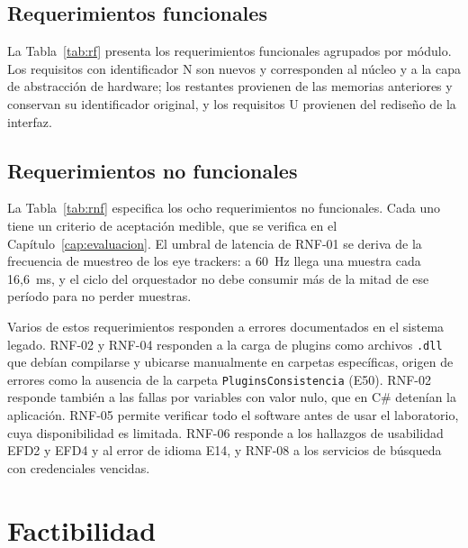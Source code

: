 \subsection{Requerimientos funcionales}

La Tabla~\ref{tab:rf} presenta los requerimientos funcionales agrupados por módulo. Los requisitos con identificador N son nuevos y corresponden al núcleo y a la capa de abstracción de hardware; los restantes provienen de las memorias anteriores y conservan su identificador original, y los requisitos U provienen del rediseño de la interfaz.

{\small}
\vspace{-1em}

\subsection{Requerimientos no funcionales}

La Tabla~\ref{tab:rnf} especifica los ocho requerimientos no funcionales. Cada uno tiene un criterio de aceptación medible, que se verifica en el Capítulo~\ref{cap:evaluacion}. El umbral de latencia de RNF-01 se deriva de la frecuencia de muestreo de los eye trackers: a 60~Hz llega una muestra cada 16,6~ms, y el ciclo del orquestador no debe consumir más de la mitad de ese período para no perder muestras.

{\small}
\vspace{-1em}

Varios de estos requerimientos responden a errores documentados en el sistema legado. RNF-02 y RNF-04 responden a la carga de plugins como archivos \texttt{.dll} que debían compilarse y ubicarse manualmente en carpetas específicas, origen de errores como la ausencia de la carpeta \texttt{PluginsConsistencia} (E50). RNF-02 responde también a las fallas por variables con valor nulo, que en C\# detenían la aplicación. RNF-05 permite verificar todo el software antes de usar el laboratorio, cuya disponibilidad es limitada. RNF-06 responde a los hallazgos de usabilidad EFD2 y EFD4 y al error de idioma E14, y RNF-08 a los servicios de búsqueda con credenciales vencidas.

\section{Factibilidad}
\label{sec:factibilidad}

